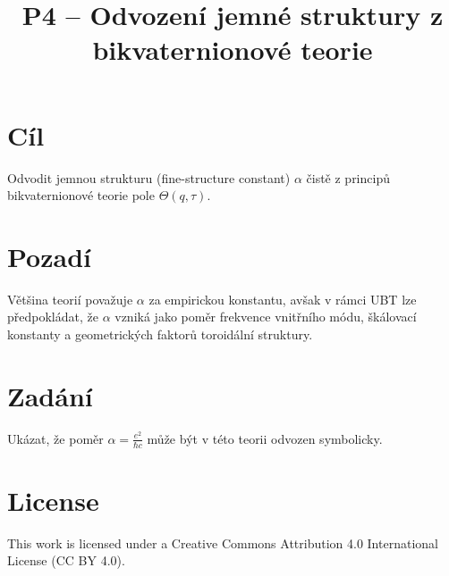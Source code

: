 \documentclass{article}
\title{P4 – Odvození jemné struktury z bikvaternionové teorie}
\author{}
\date{}
\begin{document}
\maketitle

\section*{Cíl}
Odvodit jemnou strukturu (fine-structure constant) $\alpha$ čistě z principů bikvaternionové teorie pole $\Theta(q, \tau)$.

\section*{Pozadí}
Většina teorií považuje $\alpha$ za empirickou konstantu, avšak v rámci UBT lze předpokládat, že $\alpha$ vzniká jako poměr frekvence vnitřního módu, škálovací konstanty a geometrických faktorů toroidální struktury.

\section*{Zadání}
Ukázat, že poměr $\alpha = \frac{e^2}{\hbar c}$ může být v této teorii odvozen symbolicky.


\section*{License}
This work is licensed under a Creative Commons Attribution 4.0 International License (CC BY 4.0).
\end{document}
